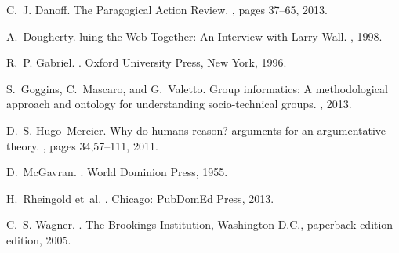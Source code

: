 \documentclass[twoside]{article}
\begin{document}
\begin{multicols}{2}
\begin{thebibliography}{10}
C.~J. Danoff.
\newblock The {P}aragogical {A}ction {R}eview.
, pages
  37--65, 2013.

A.~Dougherty.
luing the {W}eb {T}ogether: {A}n {I}nterview with {L}arry {W}all.
, 1998.

R.~P. Gabriel.
.
\newblock Oxford University Press, New York, 1996.

S.~Goggins, C.~Mascaro, and G.~Valetto.
\newblock Group informatics: A methodological approach and ontology for
  understanding socio-technical groups.
, 2013.

D.~S. Hugo~Mercier.
\newblock Why do humans reason? arguments for an argumentative theory.
, pages 34,57--111, 2011.

D.~McGavran.
.
\newblock World Dominion Press, 1955.

H.~Rheingold et~al.
.
\newblock Chicago: PubDomEd Press, 2013.

C.~S. Wagner.
.
\newblock The Brookings Institution, Washington D.C., paperback edition
  edition, 2005.

\end{thebibliography}

\end{multicols}
\end{document}
